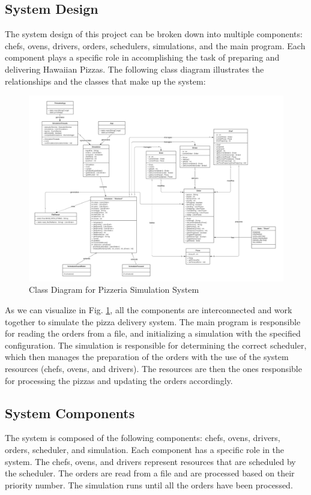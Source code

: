 \documentclass[conference]{IEEEtran}
\begin{document}
\subsection{System Design}
The system design of this project can be broken down into multiple components: chefs, ovens, drivers, orders, schedulers, simulations, and the main program. Each component plays a specific role in accomplishing the task of preparing and delivering Hawaiian Pizzas. The following class diagram illustrates the relationships and the classes that make up the system:


\begin{figure}[ht]
    \centering
    \includegraphics[width=\textwidth]{ClassDiagram.png}
    \caption{\centering Class Diagram for Pizzeria Simulation System}
    \label{fig:class_diagram}
\end{figure}

As we can visualize in Fig. \ref{fig:class_diagram}, all the components are interconnected and work together to simulate the pizza delivery system. The main program is responsible for reading the orders from a file, and initializing a simulation with the specified configuration. The simulation is responsible for determining the correct scheduler, which then manages the preparation of the orders with the use of the system resources (chefs, ovens, and drivers). The resources are then the ones responsible for processing the pizzas and updating the orders accordingly. 

\subsection{System Components}
The system is composed of the following components: chefs, ovens, drivers, orders, scheduler, and simulation. Each component has a specific role in the system. The chefs, ovens, and drivers represent resources that are scheduled by the scheduler. The orders are read from a file and are processed based on their priority number. The simulation runs until all the orders have been processed.
\end{document}
